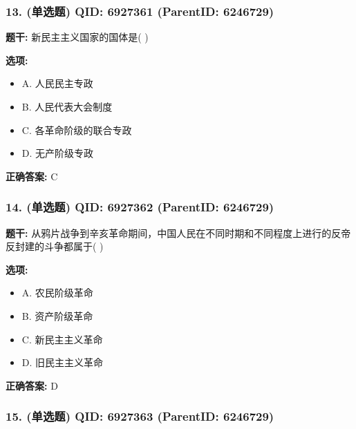 \documentclass[12pt,UTF8]{ctexart}
\begin{document}
\subsubsection*{13. (单选题) \small QID: 6927361 (ParentID: 6246729)}

\textbf{题干:}
新民主主义国家的国体是(   )



\textbf{选项:}
\begin{itemize}[leftmargin=*]

  \item A. 人民民主专政

  \item B. 人民代表大会制度

  \item C. 各革命阶级的联合专政

  \item D. 无产阶级专政

\end{itemize}

\textbf{正确答案:}
C

\vspace{0.3em}\hrulefill\vspace{0.7em}

\subsubsection*{14. (单选题) \small QID: 6927362 (ParentID: 6246729)}

\textbf{题干:}
从鸦片战争到辛亥革命期间，中国人民在不同时期和不同程度上进行的反帝反封建的斗争都属于(  )



\textbf{选项:}
\begin{itemize}[leftmargin=*]

  \item A. 农民阶级革命

  \item B. 资产阶级革命

  \item C. 新民主主义革命

  \item D. 旧民主主义革命

\end{itemize}

\textbf{正确答案:}
D

\vspace{0.3em}\hrulefill\vspace{0.7em}

\subsubsection*{15. (单选题) \small QID: 6927363 (ParentID: 6246729)}
\end{document}
